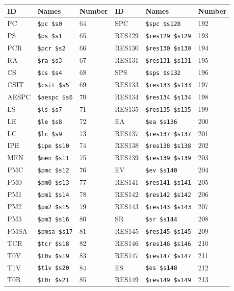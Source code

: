 \begin{table}
\begin{center}
{\small
\begin{tabular}{|l|l|l||l|l|l|} \hline
ID & Names & Number & ID & Names & Number \\ \hline
PC & \verb|$pc $s0| & 64 &
SPC & \verb|$spc $s128| & 192 \\
PS & \verb|$ps $s1| & 65 &
RES129 & \verb|$res129 $s129| & 193 \\
PCR & \verb|$pcr $s2| & 66 &
RES130 & \verb|$res130 $s130| & 194 \\
RA & \verb|$ra $s3| & 67 &
RES131 & \verb|$res131 $s131| & 195 \\
CS & \verb|$cs $s4| & 68 &
SPS & \verb|$sps $s132| & 196 \\
CSIT & \verb|$csit $s5| & 69 &
RES133 & \verb|$res133 $s133| & 197 \\
AESPC & \verb|$aespc $s6| & 70 &
RES134 & \verb|$res134 $s134| & 198 \\
LS & \verb|$ls $s7| & 71 &
RES135 & \verb|$res135 $s135| & 199 \\
LE & \verb|$le $s8| & 72 &
EA & \verb|$ea $s136| & 200 \\
LC & \verb|$lc $s9| & 73 &
RES137 & \verb|$res137 $s137| & 201 \\
IPE & \verb|$ipe $s10| & 74 &
RES138 & \verb|$res138 $s138| & 202 \\
MEN & \verb|$men $s11| & 75 &
RES139 & \verb|$res139 $s139| & 203 \\
PMC & \verb|$pmc $s12| & 76 &
EV & \verb|$ev $s140| & 204 \\
PM0 & \verb|$pm0 $s13| & 77 &
RES141 & \verb|$res141 $s141| & 205 \\
PM1 & \verb|$pm1 $s14| & 78 &
RES142 & \verb|$res142 $s142| & 206 \\
PM2 & \verb|$pm2 $s15| & 79 &
RES143 & \verb|$res143 $s143| & 207 \\
PM3 & \verb|$pm3 $s16| & 80 &
SR & \verb|$sr $s144| & 208 \\
PMSA & \verb|$pmsa $s17| & 81 &
RES145 & \verb|$res145 $s145| & 209 \\
TCR & \verb|$tcr $s18| & 82 &
RES146 & \verb|$res146 $s146| & 210 \\
T0V & \verb|$t0v $s19| & 83 &
RES147 & \verb|$res147 $s147| & 211 \\
T1V & \verb|$t1v $s20| & 84 &
ES & \verb|$es $s148| & 212 \\
T0R & \verb|$t0r $s21| & 85 &
RES149 & \verb|$res149 $s149| & 213 \\

\end{tabular}}
\end{center}
\end{table}
